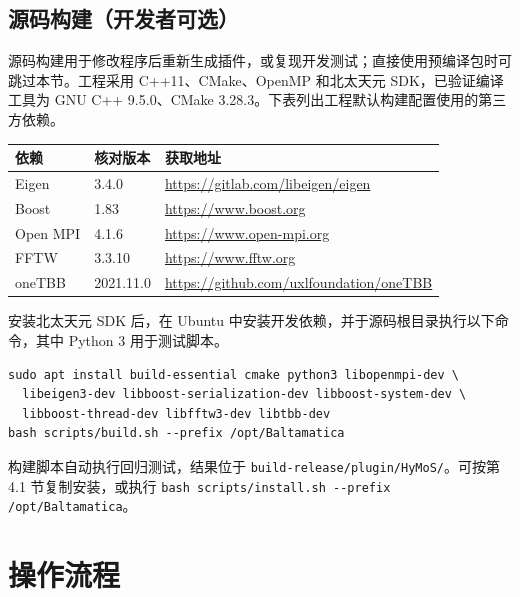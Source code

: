 \documentclass[UTF8,a4paper,11pt,fontset=fandol]{ctexart}
\newcommand{\code}[1]{\nolinkurl{#1}}
\begin{document}
\subsection{源码构建（开发者可选）}
源码构建用于修改程序后重新生成插件，或复现开发测试；直接使用预编译包时可跳过本节。工程采用 C++11、CMake、OpenMP 和北太天元 SDK，已验证编译工具为 GNU C++ 9.5.0、CMake 3.28.3。下表列出工程默认构建配置使用的第三方依赖。
\begin{center}\small
\begin{tabularx}{\textwidth}{@{}p{22mm}p{19mm}Y@{}}
\toprule
依赖 & 核对版本 & 获取地址\\
\midrule
Eigen & 3.4.0 & \url{https://gitlab.com/libeigen/eigen}\\
Boost & 1.83 & \url{https://www.boost.org}\\
Open MPI & 4.1.6 & \url{https://www.open-mpi.org}\\
FFTW & 3.3.10 & \url{https://www.fftw.org}\\
oneTBB & 2021.11.0 & \url{https://github.com/uxlfoundation/oneTBB}\\
\bottomrule
\end{tabularx}
\end{center}
安装北太天元 SDK 后，在 Ubuntu 中安装开发依赖，并于源码根目录执行以下命令，其中 Python 3 用于测试脚本。
\begin{lstlisting}
sudo apt install build-essential cmake python3 libopenmpi-dev \
  libeigen3-dev libboost-serialization-dev libboost-system-dev \
  libboost-thread-dev libfftw3-dev libtbb-dev
bash scripts/build.sh --prefix /opt/Baltamatica
\end{lstlisting}
构建脚本自动执行回归测试，结果位于 \code{build-release/plugin/HyMoS/}。可按第 4.1 节复制安装，或执行 \lstinline|bash scripts/install.sh --prefix /opt/Baltamatica|。

\Needspace{26\baselineskip}
\section{操作流程}
\end{document}
